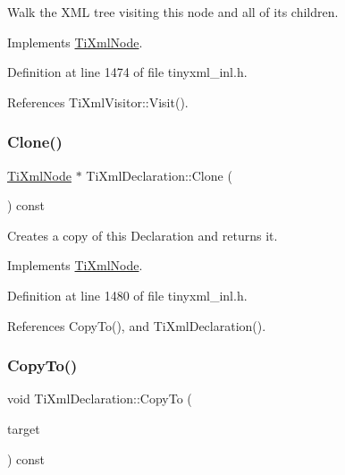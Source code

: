 Walk the X\+ML tree visiting this node and all of its children. 

Implements \hyperlink{class_ti_xml_node_acc0f88b7462c6cb73809d410a4f5bb86}{Ti\+Xml\+Node}.



Definition at line 1474 of file tinyxml\+\_\+inl.\+h.



References Ti\+Xml\+Visitor\+::\+Visit().

\hypertarget{class_ti_xml_declaration_a35dc1455f69b79e81cae28e186944610}{}\label{class_ti_xml_declaration_a35dc1455f69b79e81cae28e186944610} 
\subsubsection{\texorpdfstring{Clone()}{Clone()}}
{\footnotesize\ttfamily \hyperlink{class_ti_xml_node}{Ti\+Xml\+Node} $\ast$ Ti\+Xml\+Declaration\+::\+Clone (\begin{DoxyParamCaption}{ }\end{DoxyParamCaption}) const\hspace{0.3cm}{\ttfamily [virtual]}}



Creates a copy of this Declaration and returns it. 



Implements \hyperlink{class_ti_xml_node_a4508cc3a2d7a98e96a54cc09c37a78a4}{Ti\+Xml\+Node}.



Definition at line 1480 of file tinyxml\+\_\+inl.\+h.



References Copy\+To(), and Ti\+Xml\+Declaration().

\hypertarget{class_ti_xml_declaration_a189de17b3e04d4e5b1c385336f214af1}{}\label{class_ti_xml_declaration_a189de17b3e04d4e5b1c385336f214af1} 
\subsubsection{\texorpdfstring{Copy\+To()}{CopyTo()}}
{\footnotesize\ttfamily void Ti\+Xml\+Declaration\+::\+Copy\+To (\begin{DoxyParamCaption}\item[{\hyperlink{class_ti_xml_declaration}{Ti\+Xml\+Declaration} $\ast$}]{target }\end{DoxyParamCaption}) const\hspace{0.3cm}{\ttfamily [protected]}}



